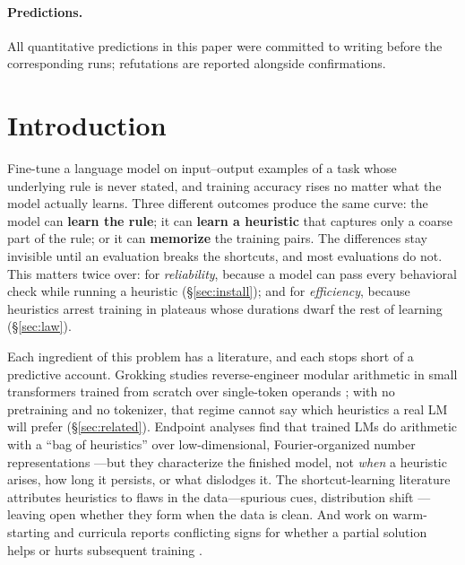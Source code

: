 \documentclass{article} %
\begin{document}
\paragraph{Predictions.} All quantitative predictions in this paper were committed to writing before the corresponding runs; refutations are reported alongside confirmations.

\section{Introduction}
\label{sec:intro}

Fine-tune a language model on input--output examples of a task whose underlying rule is never stated, and training accuracy rises no matter what the model actually learns. Three different outcomes produce the same curve: the model can \textbf{learn the rule}; it can \textbf{learn a heuristic} that captures only a coarse part of the rule; or it can \textbf{memorize} the training pairs. The differences stay invisible until an evaluation breaks the shortcuts, and most evaluations do not. This matters twice over: for \emph{reliability}, because a model can pass every behavioral check while running a heuristic (\S\ref{sec:install}); and for \emph{efficiency}, because heuristics arrest training in plateaus whose durations dwarf the rest of learning (\S\ref{sec:law}).

Each ingredient of this problem has a literature, and each stops short of a predictive account. Grokking studies reverse-engineer modular arithmetic in small transformers trained from scratch over single-token operands \citep{power2022grokking,nanda2023progress,zhong2023clock}; with no pretraining and no tokenizer, that regime cannot say which heuristics a real LM will prefer (\S\ref{sec:related}). Endpoint analyses find that trained LMs do arithmetic with a ``bag of heuristics'' \citep{nikankin2025arithmetic} over low-dimensional, Fourier-organized number representations \citep{zhou2024fourier,kantamneni2025trig,subspaces2025addition}---but they characterize the finished model, not \emph{when} a heuristic arises, how long it persists, or what dislodges it. The shortcut-learning literature attributes heuristics to flaws in the data---spurious cues, distribution shift \citep{geirhos2020shortcut}---leaving open whether they form when the data is clean. And work on warm-starting and curricula reports conflicting signs for whether a partial solution helps or hurts subsequent training \citep{ash2020warm,xu2025groktransfer}.
\end{document}
